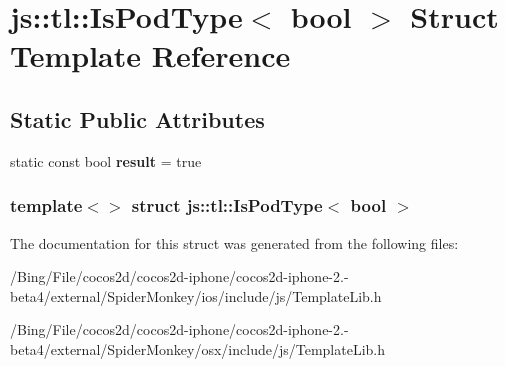 \hypertarget{structjs_1_1tl_1_1_is_pod_type_3_01bool_01_4}{\section{js\-:\-:tl\-:\-:Is\-Pod\-Type$<$ bool $>$ Struct Template Reference}
\label{structjs_1_1tl_1_1_is_pod_type_3_01bool_01_4}
}
\subsection*{Static Public Attributes}
\begin{DoxyCompactItemize}
\item 
\hypertarget{structjs_1_1tl_1_1_is_pod_type_3_01bool_01_4_ac388c2a65fd31bba5024338f34154272}{static const bool {\bfseries result} = true}\label{structjs_1_1tl_1_1_is_pod_type_3_01bool_01_4_ac388c2a65fd31bba5024338f34154272}

\end{DoxyCompactItemize}
\subsubsection*{template$<$$>$ struct js\-::tl\-::\-Is\-Pod\-Type$<$ bool $>$}



The documentation for this struct was generated from the following files\-:\begin{DoxyCompactItemize}
\item 
/\-Bing/\-File/cocos2d/cocos2d-\/iphone/cocos2d-\/iphone-\/2.-\/beta4/external/\-Spider\-Monkey/ios/include/js/Template\-Lib.\-h\item 
/\-Bing/\-File/cocos2d/cocos2d-\/iphone/cocos2d-\/iphone-\/2.-\/beta4/external/\-Spider\-Monkey/osx/include/js/Template\-Lib.\-h\end{DoxyCompactItemize}
